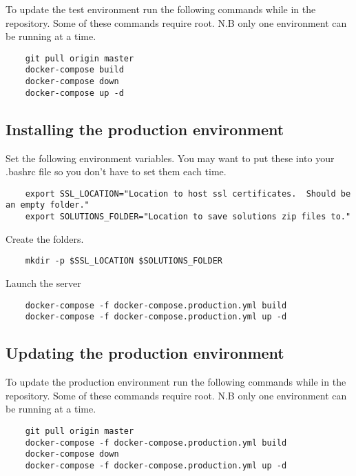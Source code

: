 To update the test environment run the following commands while in the repository.  Some of these commands require root.  N.B only one environment can be running at a time.

\begin{verbatim}
	git pull origin master
	docker-compose build
	docker-compose down
	docker-compose up -d
\end{verbatim}

\subsection{Installing the production environment}

Set the following environment variables.  You may want to put these into your .bashrc file so you don't have to set them each time.

\begin{verbatim}
	export SSL_LOCATION="Location to host ssl certificates.  Should be an empty folder."
	export SOLUTIONS_FOLDER="Location to save solutions zip files to."
\end{verbatim}

Create the folders.

\begin{verbatim}
	mkdir -p $SSL_LOCATION $SOLUTIONS_FOLDER
\end{verbatim}

Launch the server

\begin{verbatim}
	docker-compose -f docker-compose.production.yml build
	docker-compose -f docker-compose.production.yml up -d
\end{verbatim}

\subsection{Updating the production environment}

To update the production environment run the following commands while in the repository.  Some of these commands require root.  N.B only one environment can be running at a time.

\begin{verbatim}
	git pull origin master
	docker-compose -f docker-compose.production.yml build
	docker-compose down
	docker-compose -f docker-compose.production.yml up -d
\end{verbatim}
